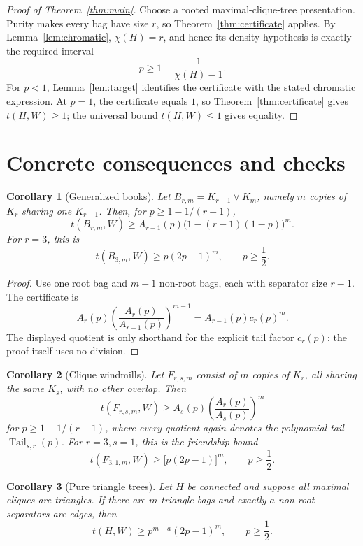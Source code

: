 \documentclass[11pt]{article}
\newtheorem{corollary}{Corollary}
\newcommand{\Tail}{\operatorname{Tail}}
\begin{document}
\begin{proof}[Proof of Theorem~\ref{thm:main}]
Choose a rooted maximal-clique-tree presentation.  Purity makes every bag
have size \(r\), so Theorem~\ref{thm:certificate} applies.  By
Lemma~\ref{lem:chromatic}, \(\chi(H)=r\), and hence its density hypothesis is
exactly the required interval
\[
    p\ge1-\frac1{\chi(H)-1}.
\]
For \(p<1\), Lemma~\ref{lem:target} identifies the certificate with the
stated chromatic expression.  At \(p=1\), the certificate equals \(1\), so
Theorem~\ref{thm:certificate} gives \(t(H,W)\ge1\); the universal bound
\(t(H,W)\le1\) gives equality.
\end{proof}

\section{Concrete consequences and checks}

\begin{corollary}[Generalized books]
Let \(B_{r,m}=K_{r-1}\vee\overline{K_m}\), namely \(m\) copies of \(K_r\)
sharing one \(K_{r-1}\).  Then, for
\(p\ge1-1/(r-1)\),
\[
    t(B_{r,m},W)
    \ge
    A_{r-1}(p)\bigl(1-(r-1)(1-p)\bigr)^m.
\]
For \(r=3\), this is
\[
    t(B_{3,m},W)\ge p(2p-1)^m,
    \qquad p\ge\frac12.
\]
\end{corollary}

\begin{proof}
Use one root bag and \(m-1\) non-root bags, each with separator size \(r-1\).
The certificate is
\[
    A_r(p)
    \left(\frac{A_r(p)}{A_{r-1}(p)}\right)^{m-1}
    =
    A_{r-1}(p)c_r(p)^m.
\]
The displayed quotient is only shorthand for the explicit tail factor
\(c_r(p)\); the proof itself uses no division.
\end{proof}

\begin{corollary}[Clique windmills]
Let \(F_{r,s,m}\) consist of \(m\) copies of \(K_r\), all sharing the same
\(K_s\), with no other overlap.  Then
\[
    t(F_{r,s,m},W)
    \ge
    A_s(p)\left(\frac{A_r(p)}{A_s(p)}\right)^m
\]
for \(p\ge1-1/(r-1)\), where every quotient again denotes the polynomial
tail \(\Tail_{s,r}(p)\).  For \(r=3,s=1\), this is the friendship bound
\[
    t(F_{3,1,m},W)
    \ge
    \bigl[p(2p-1)\bigr]^m,
    \qquad p\ge\frac12.
\]
\end{corollary}

\begin{corollary}[Pure triangle trees]
Let \(H\) be connected and suppose all maximal cliques are triangles.  If
there are \(m\) triangle bags and exactly \(a\) non-root separators are
edges, then
\[
    t(H,W)
    \ge
    p^{m-a}(2p-1)^m,
    \qquad p\ge\frac12.
\]
\end{corollary}
\end{document}
